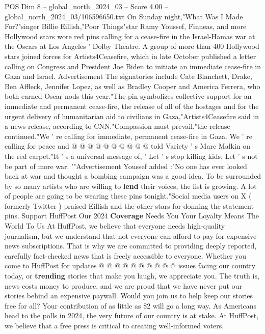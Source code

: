 \begin{textsample}{POS Dim 8 – global\_north\_2024\_03 – Score 4.00 – global\_north\_2024\_03/106596650.txt}  \label{ex:f8_pos_228}
On Sunday night,"What Was I Made For?"singer Billie Eillish,"Poor Things"star Ramy Youssef, Finneas, and more Hollywood stars wore red pins calling for a cease-fire in the Israel-Hamas war at the Oscars at Los Angeles ' Dolby Theatre.
A group of more than 400 Hollywood stars joined forces for Artists4Ceasefire, which in late October published a letter calling on Congress and President Joe Biden to initiate an immediate cease-fire in Gaza and Israel.
Advertisement The signatories include Cate Blanchett, Drake, Ben Affleck, Jennifer Lopez, as well as Bradley Cooper and America Ferrera, who both earned Oscar nods this year."The pin symbolizes collective support for an immediate and permanent cease-fire, the release of all of the hostages and for the urgent delivery of humanitarian aid to civilians in Gaza,"Artists4Ceasefire said in a news release, according to CNN."Compassion must prevail,"the release continued."We ' re calling for immediate, permanent cease-fire in Gaza.
We ' re calling for peace and @ @ @ @ @ @ @ @ @ @ told Variety ' s Marc Malkin on the red carpet."It ' s a universal message of, ' Let ' s stop killing kids.
Let ' s not be part of more war. '"Advertisement Youssef added :"No one has ever looked back at war and thought a bombing campaign was a good idea.
To be surrounded by so many artists who are willing to \textbf{lend} their voices, the list is growing.
A lot of people are going to be wearing these pins tonight."Social media users on X ( formerly Twitter ) praised Eillish and the other stars for donning the statement pins.
Support HuffPost Our 2024 \textbf{Coverage} Needs You Your Loyalty Means The World To Us At HuffPost, we believe that everyone needs high-quality journalism, but we understand that not everyone can afford to pay for expensive news subscriptions.
That is why we are committed to providing deeply reported, carefully fact-checked news that is freely accessible to everyone.
Whether you come to HuffPost for updates @ @ @ @ @ @ @ @ @ @ issues facing our country today, or \textbf{trending} stories that make you laugh, we appreciate you.
The truth is, news costs money to produce, and we are proud that we have never put our stories behind an expensive paywall.
Would you join us to help keep our stories free for all?
Your contribution of as little as \$2 will go a long way.
As Americans head to the polls in 2024, the very future of our country is at stake.
At HuffPost, we believe that a free press is critical to creating well-informed voters.

\end{textsample}
